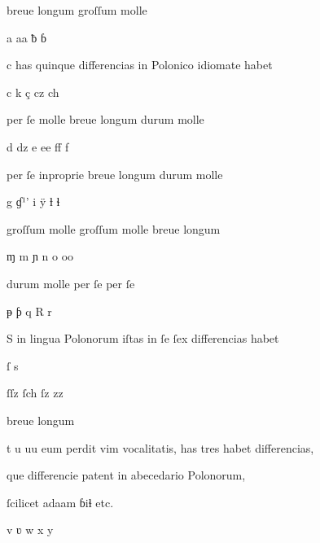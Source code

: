 {%

\newpage

\fulllines



breue longum groſſum molle

a aa ƀ ɓ

c has quinque differencias in Polonico idiomate habet

c k ç cz ch

per ſe molle breue longum durum molle

d dz e ee ff f


per ſe inproprie breue longum durum molle

g ɠ¹' i ÿ ƚ ɬ

groſſum molle groſſum molle breue longum

ɱ m ɲ n o oo


durum molle per ſe per ſe

ᵽ ƥ q R r

S in lingua Polonorum iſtas in ſe ſex differencias habet

ſ s 

ſſz ſch ſz zz

breue	longum


t u uu eum perdit vim vocalitatis, has tres habet differencias, 

que differencie patent in abecedario Polonorum, 

ſcilicet adaam ɓiɬ etc.

v ʋ w	x y

}

\endinput





















